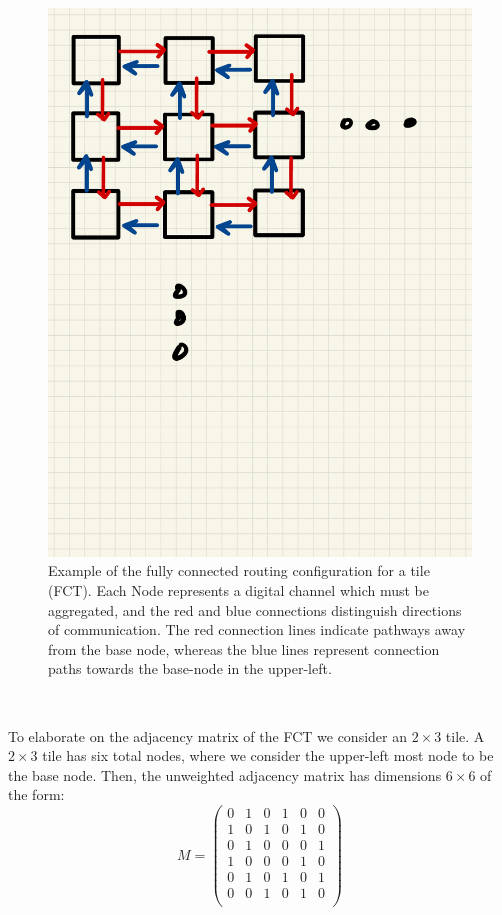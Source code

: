 \begin{figure}[]
\centering
\includegraphics[width=\textwidth]{images/Notes.pdf}
\caption{Example of the fully connected routing configuration for a tile (FCT). Each Node represents a digital channel which must be aggregated, and the red and blue connections distinguish directions of communication. The red connection lines indicate pathways away from the base node, whereas the blue lines represent connection paths towards the base-node in the upper-left.}
\end{figure}~\label{fig:fc_tile}

To elaborate on the adjacency matrix of the FCT we consider an $2\times 3$ tile.
A $2\times 3$ tile has six total nodes, where we consider the upper-left most node to be the base node.
Then, the unweighted adjacency matrix has dimensions $6\times6$ of the form:
\begin{equation}
M =
 \begin{pmatrix}
 0 & 1 & 0 & 1 & 0 & 0 \\
 1 & 0 & 1 & 0 & 1 & 0 \\
 0 & 1 & 0 & 0 & 0 & 1 \\
 1 & 0 & 0 & 0 & 1 & 0 \\
 0 & 1 & 0 & 1 & 0 & 1 \\
 0 & 0 & 1 & 0 & 1 & 0 \\
 \end{pmatrix}
\end{equation}~\label{eq:adjacency_matr}


